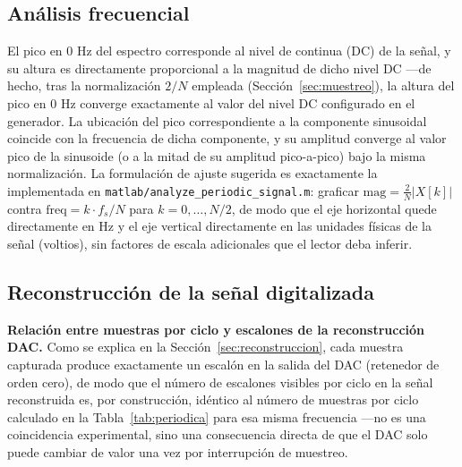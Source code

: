 \subsection{Análisis frecuencial}

El pico en $0$ Hz del espectro corresponde al nivel de continua (DC) de la señal, y su altura es directamente proporcional a la magnitud de dicho nivel DC —de hecho, tras la normalización $2/N$ empleada (Sección~\ref{sec:muestreo}), la altura del pico en $0$ Hz converge exactamente al valor del nivel DC configurado en el generador. La ubicación del pico correspondiente a la componente sinusoidal coincide con la frecuencia de dicha componente, y su amplitud converge al valor pico de la sinusoide (o a la mitad de su amplitud pico-a-pico) bajo la misma normalización. La formulación de ajuste sugerida es exactamente la implementada en \texttt{matlab/analyze\_periodic\_signal.m}: graficar $\text{mag} = \frac{2}{N}\left|X[k]\right|$ contra $\text{freq} = k \cdot f_s/N$ para $k = 0,\dots,N/2$, de modo que el eje horizontal quede directamente en Hz y el eje vertical directamente en las unidades físicas de la señal (voltios), sin factores de escala adicionales que el lector deba inferir.

\subsection{Reconstrucción de la señal digitalizada}

\textbf{Relación entre muestras por ciclo y escalones de la reconstrucción DAC.} Como se explica en la Sección~\ref{sec:reconstruccion}, cada muestra capturada produce exactamente un escalón en la salida del DAC (retenedor de orden cero), de modo que el número de escalones visibles por ciclo en la señal reconstruida es, por construcción, idéntico al número de muestras por ciclo calculado en la Tabla~\ref{tab:periodica} para esa misma frecuencia —no es una coincidencia experimental, sino una consecuencia directa de que el DAC solo puede cambiar de valor una vez por interrupción de muestreo.

